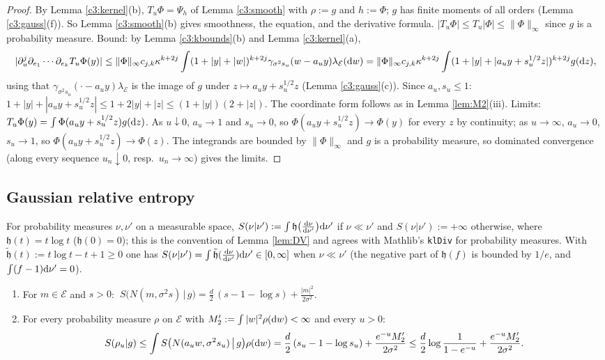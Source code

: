 \begin{proof}
By Lemma \ref{c3:kernel}(b), $T_u\Phi=\Psi_h$ of Lemma \ref{c3:smooth} with $\rho:=g$ and $h:=\Phi$; $g$ has finite moments of all orders (Lemma \ref{c3:gauss}(f)). So Lemma \ref{c3:smooth}(b) gives smoothness, the equation, and the derivative formula. $|T_u\Phi|\le T_u|\Phi|\le\|\Phi\|_\infty$ since $g$ is a probability measure.
Bound: by Lemma \ref{c3:kbounds}(b) and Lemma \ref{c3:kernel}(a),
\[
|\partial_u^j\partial_{e_1}\cdots\partial_{e_k}T_u\Phi(y)|\le\|\Phi\|_\infty c_{j,k}\kappa^{k+2j}\int(1+|y|+|w|)^{k+2j}\gamma_{\sigma^2s_u}(w-a_uy)\lambda_{\mathcal E}(\mathrm{d} w)
=\|\Phi\|_\infty c_{j,k}\kappa^{k+2j}\int(1+|y|+|a_uy+s_u^{1/2}z|)^{k+2j}g(\mathrm{d} z),
\]
using that $\gamma_{\sigma^2s_u}(\cdot-a_uy)\lambda_{\mathcal E}$ is the image of $g$ under $z\mapsto a_uy+s_u^{1/2}z$ (Lemma \ref{c3:gauss}(c)). Since $a_u,s_u\le1$: $1+|y|+|a_uy+s_u^{1/2}z|\le1+2|y|+|z|\le(1+|y|)(2+|z|)$. The coordinate form follows as in Lemma \ref{lem:M2}(iii).
Limits: $T_u\Phi(y)=\int\Phi(a_uy+s_u^{1/2}z)g(\mathrm{d} z)$. As $u\downarrow0$, $a_u\to1$ and $s_u\to0$, so $\Phi(a_uy+s_u^{1/2}z)\to\Phi(y)$ for every $z$ by continuity; as $u\to\infty$, $a_u\to0$, $s_u\to1$, so $\Phi(a_uy+s_u^{1/2}z)\to\Phi(z)$. The integrands are bounded by $\|\Phi\|_\infty$ and $g$ is a probability measure, so dominated convergence (along every sequence $u_n\downarrow0$, resp.\ $u_n\to\infty$) gives the limits.
\end{proof}

\subsection{Gaussian relative entropy}\label{c3:ss:KL}

For probability measures $\nu,\nu'$ on a measurable space, $S(\nu|\nu'):=\int\mathfrak h\big(\frac{\mathrm{d}\nu}{\mathrm{d}\nu'}\big)\mathrm{d}\nu'$ if $\nu\ll\nu'$ and $S(\nu|\nu'):=+\infty$ otherwise, where $\mathfrak h(t)=t\log t$ ($\mathfrak h(0)=0$); this is the convention of Lemma \ref{lem:DV} and agrees with Mathlib's \texttt{klDiv} for probability measures.
With $\tilde{\mathfrak h}(t):=t\log t-t+1\ge0$ one has $S(\nu|\nu')=\int\tilde{\mathfrak h}(\frac{\mathrm{d}\nu}{\mathrm{d}\nu'})\mathrm{d}\nu'\in[0,\infty]$ when $\nu\ll\nu'$ (the negative part of $\mathfrak h(f)$ is bounded by $1/e$, and $\int(f-1)\mathrm{d}\nu'=0$).

\begin{auxlemma}\label{c3:KL}
\begin{enumerate}[label=(\alph*),itemsep=1pt]
\item For $m\in\mathcal E$ and $s>0$: $\ S\big(N(m,\sigma^2s)\,\big|\,g\big)=\frac d2\,(s-1-\log s)+\frac{|m|^2}{2\sigma^2}$.
\item For every probability measure $\rho$ on $\mathcal E$ with $M_2':=\int|w|^2\rho(\mathrm{d} w)<\infty$ and every $u>0$:
\[
S(\rho_u|g)\le\int S\big(N(a_uw,\sigma^2s_u)\,\big|\,g\big)\rho(\mathrm{d} w)=\frac d2\,(s_u-1-\log s_u)+\frac{e^{-u}M_2'}{2\sigma^2}\le\frac d2\log\frac1{1-e^{-u}}+\frac{e^{-u}M_2'}{2\sigma^2}.
\]
\end{enumerate}
\end{auxlemma}

